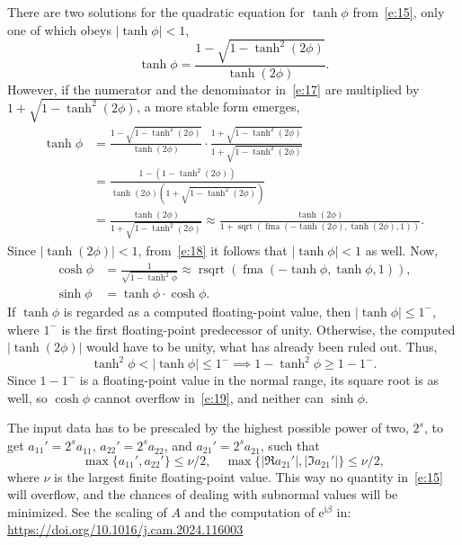 \documentclass[a4paper,12pt,twoside]{article}
\begin{document}
There are two solutions for the quadratic equation for $\tanh\phi$
from~\eqref{e:15}, only one of which obeys $|\tanh\phi|<1$,
\begin{equation}
  \tanh\phi=\frac{1-\sqrt{1-\tanh^2(2\phi)}}{\tanh(2\phi)}.
  \label{e:17}
\end{equation}
However, if the numerator and the denominator in~\eqref{e:17} are
multiplied by $1+\sqrt{1-\tanh^2(2\phi)}$, a more stable form emerges,
\begin{equation}
  \begin{split}
    \tanh\phi&=\frac{1-\sqrt{1-\tanh^2(2\phi)}}{\tanh(2\phi)}\cdot\frac{1+\sqrt{1-\tanh^2(2\phi)}}{1+\sqrt{1-\tanh^2(2\phi)}}\\
    &=\frac{1-(1-\tanh^2(2\phi))}{\tanh(2\phi)\left(1+\sqrt{1-\tanh^2(2\phi)}\right)}\\
    &=\frac{\tanh(2\phi)}{1+\sqrt{1-\tanh^2(2\phi)}}\approx\frac{\tanh(2\phi)}{1+\mathop{\mathrm{sqrt}}(\mathop{\mathrm{fma}}(-\tanh(2\phi),\tanh(2\phi),1))}.
  \end{split}
  \label{e:18}
\end{equation}
Since $|\tanh(2\phi)|<1$, from~\eqref{e:18} it follows that
$|\tanh\phi|<1$ as well.  Now,
\begin{equation}
  \begin{aligned}
    \cosh\phi&=\frac{1}{\sqrt{1-\tanh^2\phi}}\approx\mathop{\mathrm{rsqrt}}(\mathop{\mathrm{fma}}(-\tanh\phi,\tanh\phi,1)),\\
    \sinh\phi&=\tanh\phi\cdot\cosh\phi.
  \end{aligned}
  \label{e:19}
\end{equation}
If $\tanh\phi$ is regarded as a computed floating-point value, then
$|\tanh\phi|\le 1^-$, where $1^-$ is the first floating-point
predecessor of unity.  Otherwise, the computed $|\tanh(2\phi)|$ would
have to be unity, what has already been ruled out.  Thus,
\begin{displaymath}
  \tanh^2\phi<|\tanh\phi|\le 1^-\implies 1-\tanh^2\phi\ge 1-1^-.
\end{displaymath}
Since $1-1^-$ is a floating-point value in the normal range, its
square root is as well, so $\cosh\phi$ cannot overflow
in~\eqref{e:19}, and neither can $\sinh\phi$.

The input data has to be prescaled by the highest possible power of
two, $2^s$, to get $a_{11}'=2^s a_{11}^{}$, $a_{22}'=2^s a_{22}^{}$,
and $a_{21}'=2^s a_{21}^{}$, such that
\begin{equation}
  \max\{a_{11}',a_{22}'\}\le\nu/2,\quad
  \max\{|\Re{a_{21}'}|,|\Im{a_{21}'}|\}\le\nu/2,
  \label{e:20}
\end{equation}
where $\nu$ is the largest finite floating-point value.  This way no
quantity in~\eqref{e:15} will overflow, and the chances of dealing
with subnormal values will be minimized.  See the scaling of $A$ and
the computation of $\mathrm{e}^{\mathrm{i}\beta}$
in:\\\url{https://doi.org/10.1016/j.cam.2024.116003}
\end{document}
